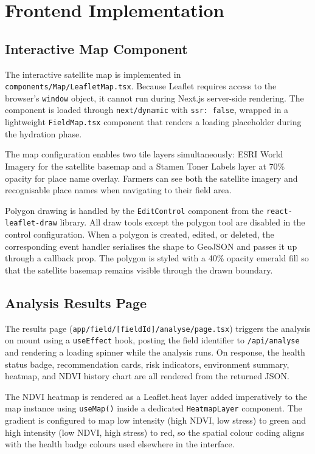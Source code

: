 \section{Frontend Implementation}

\subsection{Interactive Map Component}

The interactive satellite map is implemented in \texttt{components/Map/LeafletMap.tsx}. Because Leaflet requires access to the browser's \texttt{window} object, it cannot run during Next.js server-side rendering. The component is loaded through \texttt{next/dynamic} with \texttt{ssr: false}, wrapped in a lightweight \texttt{FieldMap.tsx} component that renders a loading placeholder during the hydration phase.

The map configuration enables two tile layers simultaneously: ESRI World Imagery for the satellite basemap and a Stamen Toner Labels layer at 70\% opacity for place name overlay. Farmers can see both the satellite imagery and recognisable place names when navigating to their field area.

Polygon drawing is handled by the \texttt{EditControl} component from the \texttt{react-leaflet-draw} library. All draw tools except the polygon tool are disabled in the control configuration. When a polygon is created, edited, or deleted, the corresponding event handler serialises the shape to GeoJSON and passes it up through a callback prop. The polygon is styled with a 40\% opacity emerald fill so that the satellite basemap remains visible through the drawn boundary.

\subsection{Analysis Results Page}

The results page (\texttt{app/field/[fieldId]/analyse/page.tsx}) triggers the analysis on mount using a \texttt{useEffect} hook, posting the field identifier to \texttt{/api/analyse} and rendering a loading spinner while the analysis runs. On response, the health status badge, recommendation cards, risk indicators, environment summary, heatmap, and NDVI history chart are all rendered from the returned JSON.

The NDVI heatmap is rendered as a Leaflet.heat layer added imperatively to the map instance using \texttt{useMap()} inside a dedicated \texttt{HeatmapLayer} component. The gradient is configured to map low intensity (high NDVI, low stress) to green and high intensity (low NDVI, high stress) to red, so the spatial colour coding aligns with the health badge colours used elsewhere in the interface.

